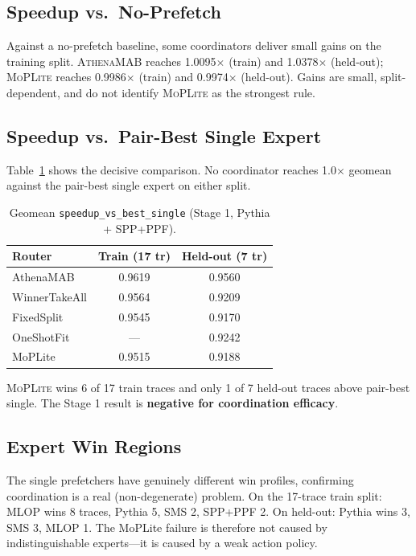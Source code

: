 \documentclass[10pt,twocolumn]{article}
\begin{document}
\subsection{Speedup vs.\ No-Prefetch}

Against a no-prefetch baseline, some coordinators deliver small gains on the
training split. \textsc{AthenaMAB} reaches 1.0095$\times$ (train) and 1.0378$\times$
(held-out); \textsc{MoPLite} reaches 0.9986$\times$ (train) and 0.9974$\times$
(held-out). Gains are small, split-dependent, and do not identify \textsc{MoPLite}
as the strongest rule.

\subsection{Speedup vs.\ Pair-Best Single Expert}

Table~\ref{tab:stage1_main} shows the decisive comparison. No coordinator reaches
1.0$\times$ geomean against the pair-best single expert on either split.

\begin{table}[h]
\centering
\caption{Geomean \texttt{speedup\_vs\_best\_single} (Stage 1, Pythia + SPP+PPF).}
\label{tab:stage1_main}
\small
\begin{tabular}{lcc}
\toprule
\textbf{Router} & \textbf{Train (17 tr)} & \textbf{Held-out (7 tr)} \\
\midrule
AthenaMAB       & 0.9619 & 0.9560 \\
WinnerTakeAll   & 0.9564 & 0.9209 \\
FixedSplit       & 0.9545 & 0.9170 \\
OneShotFit       & ---    & 0.9242 \\
MoPLite          & 0.9515 & 0.9188 \\
\bottomrule
\end{tabular}
\end{table}

\textsc{MoPLite} wins 6 of 17 train traces and only 1 of 7 held-out traces above
pair-best single. The Stage 1 result is \textbf{negative for coordination efficacy}.

\subsection{Expert Win Regions}

The single prefetchers have genuinely different win profiles, confirming coordination
is a real (non-degenerate) problem. On the 17-trace train split: MLOP wins 8 traces,
Pythia 5, SMS 2, SPP+PPF 2. On held-out: Pythia wins 3, SMS 3, MLOP 1.
The MoPLite failure is therefore not caused by indistinguishable experts—it is caused
by a weak action policy.
\end{document}
